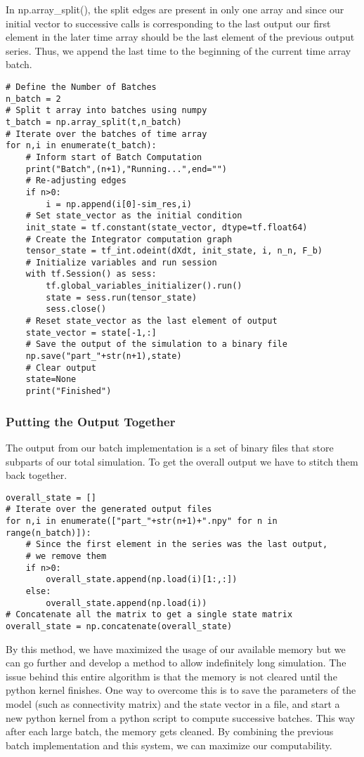 \documentclass[10pt,letterpaper]{article}
\begin{document}
In np.array\_split(), the split edges are present in only one array and since our initial vector to successive calls is corresponding to the last output our first element in the later time array should be the last element of the previous output series. Thus, we append the last time to the beginning of the current time array batch.

\begin{verbatim}
# Define the Number of Batches
n_batch = 2
# Split t array into batches using numpy
t_batch = np.array_split(t,n_batch)
# Iterate over the batches of time array
for n,i in enumerate(t_batch):
    # Inform start of Batch Computation
    print("Batch",(n+1),"Running...",end="")
    # Re-adjusting edges
    if n>0:
        i = np.append(i[0]-sim_res,i)
    # Set state_vector as the initial condition
    init_state = tf.constant(state_vector, dtype=tf.float64)
    # Create the Integrator computation graph
    tensor_state = tf_int.odeint(dXdt, init_state, i, n_n, F_b)
    # Initialize variables and run session
    with tf.Session() as sess:
        tf.global_variables_initializer().run()
        state = sess.run(tensor_state)
        sess.close()
    # Reset state_vector as the last element of output
    state_vector = state[-1,:]
    # Save the output of the simulation to a binary file
    np.save("part_"+str(n+1),state)
    # Clear output
    state=None
    print("Finished")
\end{verbatim}

\subsubsection*{Putting the Output Together}

The output from our batch implementation is a set of binary files that store subparts of our total simulation. To get the overall output we have to stitch them back together.

\begin{verbatim}
overall_state = []
# Iterate over the generated output files
for n,i in enumerate(["part_"+str(n+1)+".npy" for n in range(n_batch)]):
    # Since the first element in the series was the last output, 
    # we remove them
    if n>0:
        overall_state.append(np.load(i)[1:,:])
    else:
        overall_state.append(np.load(i))
# Concatenate all the matrix to get a single state matrix
overall_state = np.concatenate(overall_state)
\end{verbatim}

By this method, we have maximized the usage of our available memory but we can go further and develop a method to allow indefinitely long simulation. The issue behind this entire algorithm is that the memory is not cleared until the python kernel finishes. One way to overcome this is to save the parameters of the model (such as connectivity matrix) and the state vector in a file, and start a new python kernel from a python script to compute successive batches. This way after each large batch, the memory gets cleaned. By combining the previous batch implementation and this system, we can maximize our computability.
\end{document}
